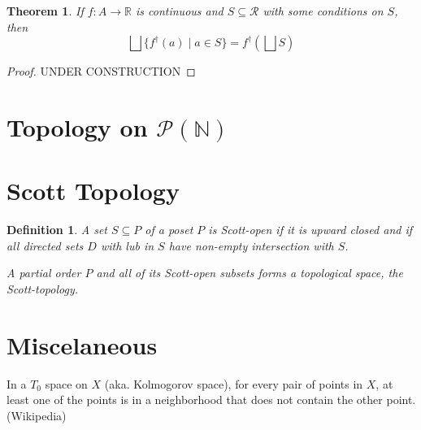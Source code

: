 \documentclass{article}
\newtheorem{theorem}{Theorem}%
\newtheorem{definition}{Definition}%
\newcommand{\Reals}[0]{\mathbb{R}}
\begin{document}
\begin{theorem}
  If $f : A \to \Reals$ is continuous and $S \subseteq \mathcal{R}$
  with some conditions on $S$, 
  then 
  \[
  \bigsqcup \{ f^\dagger(a) \mid a \in S \} = f^\dagger\left(\bigsqcup S\right)
  \]
\end{theorem}
\begin{proof}
UNDER CONSTRUCTION
\end{proof}



\section{Topology on $\mathcal{P}(\mathbb{N})$}



\section{Scott Topology}

\begin{definition}
A set $S \subseteq P$ of a poset $P$ is Scott-open if it is upward
closed and if all directed sets $D$ with lub in $S$ have non-empty
intersection with $S$.

A partial order $P$ and all of its Scott-open subsets forms a
topological space, the Scott-topology.
\end{definition}

\section{Miscelaneous}

In a $T_0$ space on $X$ (aka. Kolmogorov space), for every pair of
points in $X$, at least one of the points is in a neighborhood that
does not contain the other point. (Wikipedia)
\end{document}
